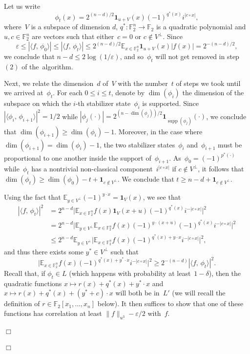 \documentclass[11pt]{amsart}
\newcommand{\E}{\mathbb{E}}
\newcommand{\F}{\mathbb{F}} %
\newcommand{\one}{\mathbf{1}}
\DeclareMathOperator{\supp}{supp}
\newcommand{\eps}{\varepsilon}
\theoremstyle{plain}
\theoremstyle{definition}
\theoremstyle{remark}
\renewenvironment{proof}[1][]{
    	\begin{trivlist}
     	\item[\hspace{\labelsep}{\em\noindent Proof#1:\/}]}
     	{{\hfill$\Box$}
    	\end{trivlist}
  }
\begin{document}
\begin{proof}[ of \cref{thm:quadratic_GL}]
\begin{proof}
Let us write
$$\phi_t(x) = 2^{(n-d)/2} \one_{u+V}(x) (-1)^{q^*(x)} i^{|c\circ x|},$$
where~$V$ is a subspace of dimension $d$, $q^*: \F_2^n \to \F_2$ is a quadratic polynomial and $u, c \in \F_2^n$ are vectors such that either~$c=0$ or $c\notin V^{\perp}$.
Since
$$\eps \leq |\langle f,\, \phi_0 \rangle| \leq |\langle f,\, \phi_t \rangle| \leq 2^{(n-d)/2} \E_{x\in \F_2^n} \one_{u+V}(x) |f(x)| = 2^{-(n-d)/2},$$
we conclude that $n-d \leq 2\log(1/\eps)$, and so~$\phi_t$ will not get removed in step~$(2)$ of the~algorithm.

Next, we relate the dimension~$d$ of~$V$ with the number~$t$ of steps we took until we arrived at~$\phi_t$.
For each $0\leq i\leq t$, denote by $\dim(\phi_i)$ the dimension of the subspace on which the $i$-th stabilizer state~$\phi_i$ is supported.
Since $|\langle\phi_i,\, \phi_{i+1}\rangle|^2 = 1/2$ while $|\phi_j(\cdot)| = 2^{(n-\dim(\phi_j))/2} \one_{\supp(\phi_j)}(\cdot)$, we conclude that
$\dim(\phi_{i+1}) \geq \dim(\phi_i)-1$.
Moreover, in the case where $\dim(\phi_{i+1}) = \dim(\phi_i)-1$, the two stabilizer states~$\phi_i$ and~$\phi_{i+1}$ must be proportional to one another inside the support of~$\phi_{i+1}$.
As~$\phi_0 = (-1)^{p^*(\cdot)}$ while~$\phi_t$ has a nontrivial non-classical component~$i^{|c\circ x|}$ if $c\notin V^{\perp}$, it follows that $\dim(\phi_t) \geq \dim(\phi_0) - t + \one_{c\notin V^{\perp}}$.
We conclude that $t \geq n-d + \one_{c\notin V^{\perp}}$.

Using the fact that $\E_{y\in V^{\perp}} (-1)^{y\cdot x} = \one_V(x)$, we see that
\begin{align*}
    |\langle f,\, \phi_t \rangle|^2
    &= 2^{n-d} \big|\E_{x\in \F_2^n} f(x) \one_{V}(x+u) (-1)^{q^*(x)} i^{-|c\circ x|}\big|^2 \\
    &= 2^{n-d} \big|\E_{y\in V^{\perp}} \E_{x\in \F_2^n} f(x) (-1)^{y\cdot (x+u)} (-1)^{q^*(x)} i^{-|c\circ x|}\big|^2 \\
    &\leq 2^{n-d} \E_{y\in V^{\perp}} \big|\E_{x\in \F_2^n} f(x) (-1)^{q^*(x) + y\cdot x} i^{-|c\circ x|}\big|^2,
\end{align*}
and thus there exists some $y^* \in V^{\perp}$ such that
\begin{equation} \label{eq:ystar}
    \big|\E_{x\in \F_2^n} f(x) (-1)^{q^*(x) + y^* \cdot x} i^{-|c\circ x|}\big|^2 \geq 2^{-(n-d)} |\langle f,\, \phi_t \rangle|^2.
\end{equation}
Recall that, if $\phi_t \in L$ (which happens with probability at least~$1-\delta$), then the quadratic functions $x\mapsto r(x) + q^*(x) + y^*\cdot x$ and $x\mapsto r(x) + q^*(x) + (y^*+c)\cdot x$ will both be in~$L'$
(we will recall the definition of $r\in \F_2[x_1, \dots, x_n]$ below).
It then suffices to show that one of these functions has correlation at least $\|f\|_{u^3}-\eps/2$ with~$f$.


\end{proof}
\end{proof}
\end{document}

